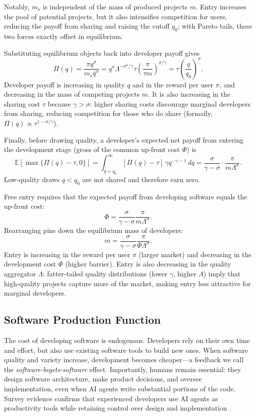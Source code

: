 \documentclass[11pt,a4paper]{article}
\theoremstyle{definition}
\theoremstyle{remark}
\begin{document}
Notably, \(m_s\) is independent of the mass of produced projects \(m\).
Entry increases the pool of potential projects, but it also intensifies
competition for users, reducing the payoff from sharing and raising the
cutoff \(q_0\); with Pareto tails, these two forces exactly offset in
equilibrium.

Substituting equilibrium objects back into developer payoff gives \[
\Pi(q) = \frac{\pi q^\sigma}{m_s \bar q^\sigma} = q^\sigma \Lambda^{-\sigma^2/\gamma} \tau \left(\frac{\pi}{\tau m}\right)^{\sigma/\gamma} = \tau\left(\frac{q}{q_0}\right)^{\sigma}.
\] Developer payoff is increasing in quality \(q\) and in the reward per
user \(\pi\), and decreasing in the mass of competing projects \(m\). It
is also increasing in the sharing cost \(\tau\) because \(\gamma>\sigma\):
higher sharing costs discourage marginal developers from sharing,
reducing competition for those who do share (formally,
\(\Pi(q)\propto \tau^{1-\sigma/\gamma}\)).

Finally, before drawing quality, a developer's expected net payoff from
entering the development stage (gross of the common up-front cost
\(\Phi\)) is \[
\mathbb E[\max\{\Pi(q)-\tau,0\}] = \int_{q=q_0}^\infty [\Pi(q)-\tau]\,\gamma q^{-\gamma-1}\, d q = \frac{\sigma}{\gamma - \sigma} \cdot \frac{\pi}{m \Lambda^\sigma}.
\] Low-quality draws \(q<q_0\) are not shared and therefore earn zero.

Free entry requires that the expected payoff from developing software
equals the up-front cost: \[
\Phi = \frac{\sigma}{\gamma-\sigma}\frac{\pi}{m\Lambda^\sigma}.
\] Rearranging pins down the equilibrium mass of developers: \[
m =\frac{\sigma}{\gamma-\sigma}\frac{\pi}{\Phi\Lambda^\sigma}. 
\] Entry is increasing in the reward per user \(\pi\) (larger market)
and decreasing in the development cost \(\Phi\) (higher barrier). Entry
is also decreasing in the quality aggregator \(\Lambda\): fatter-tailed
quality distributions (lower \(\gamma\), higher \(\Lambda\)) imply that
high-quality projects capture more of the market, making entry less
attractive for marginal developers.

\subsection{Software Production
Function}\label{software-production-function}

The cost of developing software is endogenous. Developers rely on their
own time and effort, but also use existing software tools to build new
ones. When software quality and variety increase, development becomes
cheaper---a feedback we call the \emph{software-begets-software} effect.
Importantly, humans remain essential: they design software architecture,
make product decisions, and oversee implementation, even when AI agents
write substantial portions of the code. Survey evidence confirms that
experienced developers use AI agents as productivity tools while
retaining control over design and implementation
\citep{huang-2025-control}.
\end{document}
